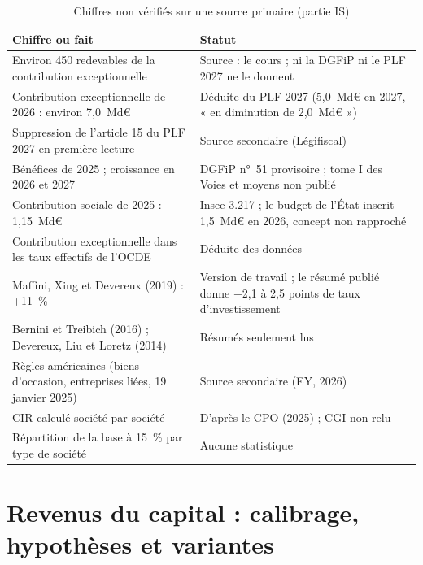 \documentclass[11pt,a4paper]{article}
\begin{document}
\begin{table}[!htbp]\centering\scriptsize
\caption{Chiffres non vérifiés sur une source primaire (partie IS)}\label{tab:is_nonverif}
\begin{tabularx}{\linewidth}{@{}>{\raggedright\arraybackslash}p{5.6cm}>{\raggedright\arraybackslash}X@{}}
\toprule
Chiffre ou fait & Statut \\
\midrule
Environ 450 redevables de la contribution exceptionnelle & Source : le cours ; ni la DGFiP ni le PLF 2027 ne le donnent \\
Contribution exceptionnelle de 2026 : environ 7,0~Md€ & Déduite du PLF 2027 (5,0~Md€ en 2027, « en diminution de
2,0~Md€ ») \\
Suppression de l'article 15 du PLF 2027 en première lecture & Source secondaire (Légifiscal) \\
Bénéfices de 2025 ; croissance en 2026 et 2027 & DGFiP n°~51 provisoire ; tome I des Voies et moyens non publié \\
Contribution sociale de 2025 : 1,15~Md€ & Insee 3.217 ; le budget de l'État inscrit 1,5~Md€ en 2026, concept non rapproché \\
Contribution exceptionnelle dans les taux effectifs de l'OCDE & Déduite des données \\
Maffini, Xing et Devereux (2019) : +11~\% & Version de travail ; le résumé publié donne +2,1 à 2,5 points de taux
d'investissement \\
Bernini et Treibich (2016) ; Devereux, Liu et Loretz (2014) & Résumés seulement lus \\
Règles américaines (biens d'occasion, entreprises liées, 19 janvier 2025) & Source secondaire (EY, 2026) \\
CIR calculé société par société & D'après le CPO (2025) ; CGI non relu \\
Répartition de la base à 15~\% par type de société & Aucune statistique \\
\bottomrule
\end{tabularx}
\end{table}

\section{Revenus du capital : calibrage, hypothèses et variantes}\label{ann:pfu}
\end{document}
